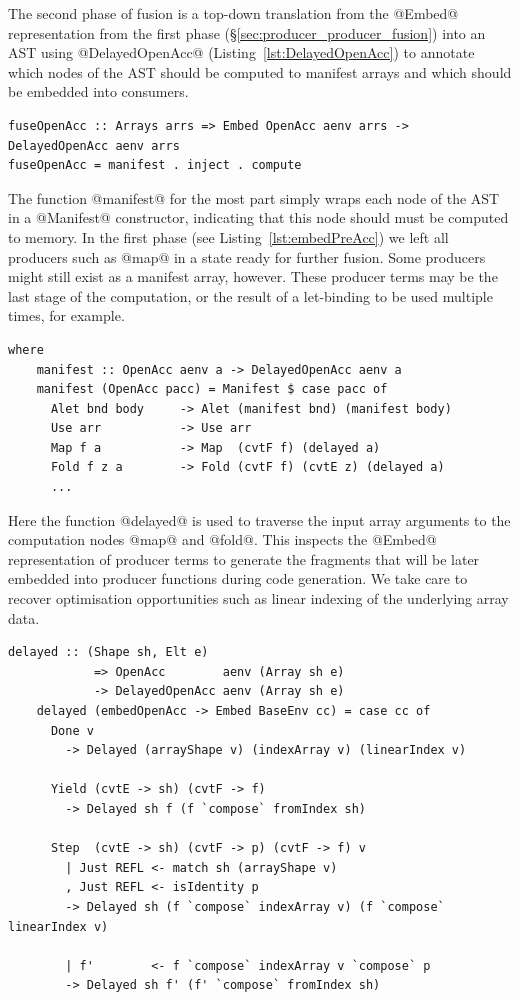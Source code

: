 The second phase of fusion is a top-down translation from the @Embed@
representation from the first phase (\S\ref{sec:producer_producer_fusion}) into
an AST using @DelayedOpenAcc@ (Listing~\ref{lst:DelayedOpenAcc}) to
annotate which nodes of the AST should be computed to manifest arrays and which
should be embedded into consumers.

\begin{lstlisting}[style=haskell
    ,name=fuseOpenAcc
    ,label=lst:fuseOpenAcc
    ,caption={[Consumer fusion via top-down knot-tying of the AST]}]
fuseOpenAcc :: Arrays arrs => Embed OpenAcc aenv arrs -> DelayedOpenAcc aenv arrs
fuseOpenAcc = manifest . inject . compute
\end{lstlisting}

The function @manifest@ for the most part simply wraps each node of the
AST in a @Manifest@ constructor, indicating
that this node should must be computed to memory. In the first phase (see
Listing~\ref{lst:embedPreAcc}) we left all producers such as @map@ in a
state ready for further fusion. Some producers might still exist as a manifest
array, however. These producer terms may be the last stage of the computation,
or the result of a let-binding to be used multiple times, for example.

\begin{lstlisting}[style=haskell,name=fuseOpenAcc]
  where
    manifest :: OpenAcc aenv a -> DelayedOpenAcc aenv a
    manifest (OpenAcc pacc) = Manifest $ case pacc of
      Alet bnd body     -> Alet (manifest bnd) (manifest body)
      Use arr           -> Use arr
      Map f a           -> Map  (cvtF f) (delayed a)
      Fold f z a        -> Fold (cvtF f) (cvtE z) (delayed a)
      ...
\end{lstlisting}

Here the function @delayed@ is used to traverse the input array arguments
to the computation nodes @map@ and @fold@. This inspects the
@Embed@ representation of producer terms to generate the fragments that
will be later embedded into producer functions during code generation. We take
care to recover optimisation opportunities such as linear indexing of the
underlying array data.

\begin{lstlisting}[style=haskell,name=fuseOpenAcc]
    delayed :: (Shape sh, Elt e)
            => OpenAcc        aenv (Array sh e)
            -> DelayedOpenAcc aenv (Array sh e)
    delayed (embedOpenAcc -> Embed BaseEnv cc) = case cc of
      Done v
        -> Delayed (arrayShape v) (indexArray v) (linearIndex v)

      Yield (cvtE -> sh) (cvtF -> f)
        -> Delayed sh f (f `compose` fromIndex sh)

      Step  (cvtE -> sh) (cvtF -> p) (cvtF -> f) v
        | Just REFL <- match sh (arrayShape v)
        , Just REFL <- isIdentity p
        -> Delayed sh (f `compose` indexArray v) (f `compose` linearIndex v)

        | f'        <- f `compose` indexArray v `compose` p
        -> Delayed sh f' (f' `compose` fromIndex sh)
\end{lstlisting}


